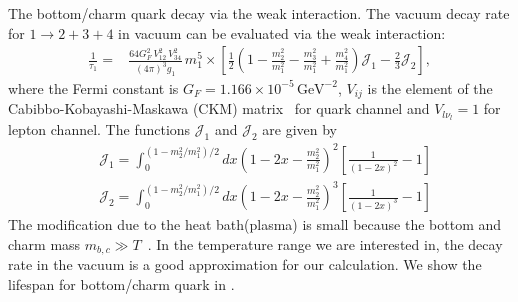 The bottom/charm quark decay via the weak interaction.
The vacuum decay rate for $1\to2+3+4$ in vacuum can be evaluated via the weak interaction:
\begin{align}
\frac{1}{\tau_1}=&\frac{64G^2_F\,V^2_{12}\,V^2_{34}}{(4\pi)^3g_1}\,m^5_1\times\left[\frac{1}{2}{\left(1-\frac{m^2_2}{m^2_1}-\frac{m^2_3}{m^2_1}+\frac{m^2_4}{m^2_1}\right)}\mathcal{J}_1-\frac{2}{3}\mathcal{J}_2\right],
\end{align}
where the Fermi constant is $G_F=1.166\times10^{-5}\,\mathrm{GeV}^{-2}$, $V_{ij}$ is the element of the Cabibbo-Kobayashi-Maskawa (CKM) matrix~\cite{Czarnecki:2004cw} for quark channel and $V_{l\nu_l}=1$ for lepton channel. The functions $\mathcal{J}_1$ and $\mathcal{J}_2$ are given by
\begin{align}
&\mathcal{J}_1\!=\!\!\!\int_0^{(1-m^2_2/m^2_1)/2}\!\!\!\!\!\!\!\!dx\left(1\!-\!2x\!-\!\frac{m^2_2}{m_1^2}\right)^{\!\!2}\left[\frac{1}{(1-2x)^2}-1\right]\\
&\mathcal{J}_2\!=\!\!\!\int_0^{(1-m^2_2/m^2_1)/2}\!\!\!\!\!\!\!\!dx\left(1\!-\!2x\!-\!\frac{m^2_2}{m_1^2}\right)^{\!\!3}\left[\frac{1}{(1-2x)^3}-1\right]
\end{align}
The modification due to the heat bath(plasma) is small because the bottom and charm  mass $m_{b,c}\gg T$~\cite{Kuznetsova:2008jt}. In the temperature range we are interested in, the decay rate in the vacuum is a good approximation for our calculation. We show the lifespan for bottom/charm quark in . 




